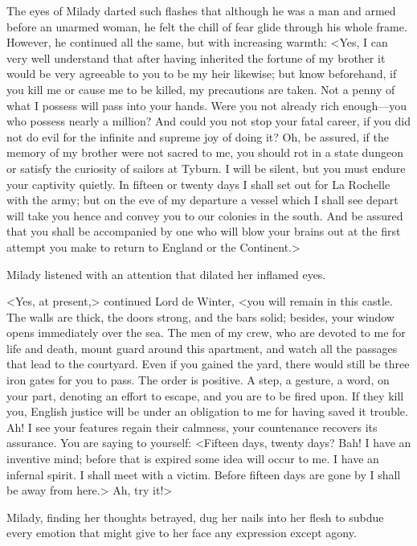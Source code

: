 The eyes of Milady darted such flashes that although he was a man and armed before an unarmed woman, he felt the chill of fear glide through his whole frame. However, he continued all the same, but with increasing warmth: <Yes, I can very well understand that after having inherited the fortune of my brother it would be very agreeable to you to be my heir likewise; but know beforehand, if you kill me or cause me to be killed, my precautions are taken. Not a penny of what I possess will pass into your hands. Were you not already rich enough---you who possess nearly a million? And could you not stop your fatal career, if you did not do evil for the infinite and supreme joy of doing it? Oh, be assured, if the memory of my brother were not sacred to me, you should rot in a state dungeon or satisfy the curiosity of sailors at Tyburn. I will be silent, but you must endure your captivity quietly. In fifteen or twenty days I shall set out for La Rochelle with the army; but on the eve of my departure a vessel which I shall see depart will take you hence and convey you to our colonies in the south. And be assured that you shall be accompanied by one who will blow your brains out at the first attempt you make to return to England or the Continent.> 

Milady listened with an attention that dilated her inflamed eyes. 

<Yes, at present,> continued Lord de Winter, <you will remain in this castle. The walls are thick, the doors strong, and the bars solid; besides, your window opens immediately over the sea. The men of my crew, who are devoted to me for life and death, mount guard around this apartment, and watch all the passages that lead to the courtyard. Even if you gained the yard, there would still be three iron gates for you to pass. The order is positive. A step, a gesture, a word, on your part, denoting an effort to escape, and you are to be fired upon. If they kill you, English justice will be under an obligation to me for having saved it trouble. Ah! I see your features regain their calmness, your countenance recovers its assurance. You are saying to yourself: <Fifteen days, twenty days? Bah! I have an inventive mind; before that is expired some idea will occur to me. I have an infernal spirit. I shall meet with a victim. Before fifteen days are gone by I shall be away from here.> Ah, try it!> 

Milady, finding her thoughts betrayed, dug her nails into her flesh to subdue every emotion that might give to her face any expression except agony. 

